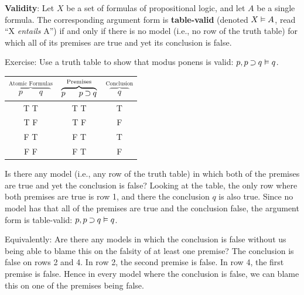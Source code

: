\documentclass[options]{philosophersimprint}
\theoremstyle{definition}
\begin{document}
\textbf{Validity}: Let $X$ be a set of formulas of propositional logic, and let $A$ be a single formula. The corresponding argument form is \textbf{table-valid} (denoted $X \vDash A$, read ``X \textit{entails} A'') if and only if there is no model (i.e., no row of the truth table) for which all of its premises are true and yet its conclusion is false.

Exercise: Use a truth table to show that modus ponens is valid: $p, p \mathbin{\supset} q \vDash q$.

\begin{table}[h!]
    \centering
    \begin{tabular}{c | c | c}
        $\overbrace{\quad p \qquad q\quad}^\text{Atomic Formulas}$ & $\overbrace{p \ \ \quad p \mathbin{\supset} q}^\text{Premises}$ & $\overbrace{\quad q\quad}^\text{Conclusion}$\\
        \hline
        T \qquad T & T \qquad T \quad & T\\
        T \qquad F & T \qquad F \quad & F\\
        F \qquad T & F \qquad T \quad & T\\
        F \qquad F & F \qquad T \quad & F\\
    \end{tabular}
\end{table}
Is there any model (i.e., any row of the truth table) in which both of the premises are true and yet the conclusion is false? Looking at the table, the only row where both premises are true is row 1, and there the conclusion $q$ is also true. Since no model has that all of the premises are true and the conclusion false, the argument form is table-valid: $p, p \mathbin{\supset} q \vDash q$.

Equivalently: Are there any models in which the conclusion is false without us being able to blame this on the falsity of at least one premise? The conclusion is false on rows 2 and 4. In row 2, the second premise is false. In row 4, the first premise is false. Hence in every model where the conclusion is false, we can blame this on one of the premises being false.
\end{document}
